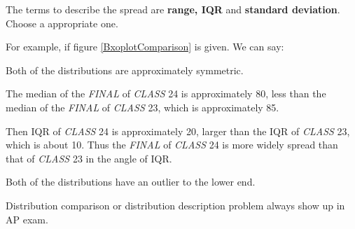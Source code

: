 \documentclass[a4paper, 12pt,twoside]{book}
\begin{document}
\begin{itemize}
The terms to describe the spread are \textbf{range, IQR} and \textbf{standard deviation}. Choose a  appropriate one.
 

\vspace{0.6cm}
For example, if figure \ref{BxoplotComparison} is given. We can say:

 Both of the distributions are approximately symmetric. 
 
 The median of the \textit{FINAL} of \textit{CLASS} 24 is approximately 80, less than the median of the \textit{FINAL} of \textit{CLASS} 23, which is approximately 85.
 
 Then IQR of \textit{CLASS} 24 is approximately 20, larger than the IQR of \textit{CLASS} 23, which is about 10. Thus the \textit{FINAL} of \textit{CLASS} 24 is more widely spread than that of \textit{CLASS} 23 in the angle of IQR.
 
 Both of the distributions have an outlier to the lower end.
 
\colorbox{babypink}{Distribution comparison or distribution description problem always show up in AP exam.} 
\end{itemize}
\end{document}
